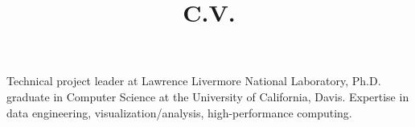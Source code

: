 \documentclass[11pt,a4paper,sans]{moderncv}        %
\title{C.V.}
\begin{document}
\makecvtitle

\small{Technical project leader at Lawrence Livermore National
Laboratory, Ph.D. graduate in Computer Science at the University of California, Davis. 
Expertise in data engineering, visualization/analysis,
high-performance computing.}






\end{document}
